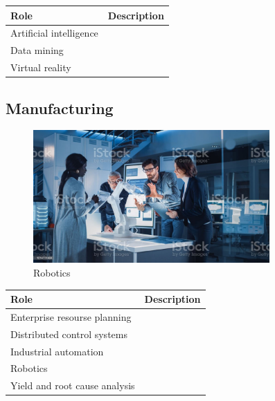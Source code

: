 \begin{table}[H]
	\begin{center}
		\begin{tabular}{p{1.3in}|p{3in}} 
			\textbf{Role} & \textbf{Description}\\
			\hline
			Artificial intelligence & \\
			\hline
			Data mining & \\
			\hline
			Virtual reality & \\
			\hline
		\end{tabular}
	\end{center}
\end{table}

\subsection{Manufacturing}

\begin{figure}[H]
	\begin{center}
		\caption{Robotics}
		\vskip 4pt
		\includegraphics[height=2in]{images/careers/istockphoto-1214111404-1024x1024.jpg}
	\end{center}
\end{figure}

\begin{table}[H]
	\begin{center}
		\begin{tabular}{p{1.3in}|p{3in}} 
			\textbf{Role} & \textbf{Description}\\
			\hline
			Enterprise resourse planning & \\
			\hline
			Distributed control systems & \\
			\hline
			Industrial automation & \\
			\hline
			Robotics & \\
			\hline
			Yield and root cause analysis & \\
			\hline
		\end{tabular}
	\end{center}
\end{table}

